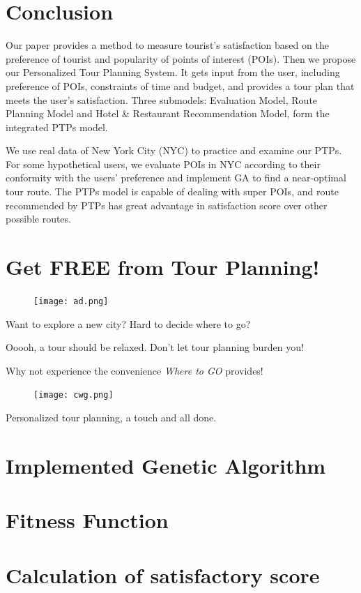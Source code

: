 \documentclass{mcmthesis}
\begin{document}
\section{Conclusion}
  Our paper provides a method to measure tourist's satisfaction based on the preference of tourist and popularity of points of interest (POIs). Then we propose our Personalized Tour Planning System. It gets input from the user, including preference of POIs, constraints of time and budget, and provides a tour plan that meets the user's satisfaction. Three submodels: Evaluation Model, Route Planning Model and Hotel \& Restaurant Recommendation Model, form the integrated PTPs model. \par
  We use real data of New York City (NYC) to practice and examine our PTPs. For some hypothetical users, we evaluate POIs in NYC according to their conformity with the users' preference and implement GA to find a near-optimal tour route. The PTPs model is capable of dealing with super POIs, and route recommended by PTPs has great advantage in satisfaction score over other possible routes.








\newpage
\section*{Get FREE from Tour Planning!}
  \begin{figure}[h]
    \centering
    \texttt{[image: ad.png]}
  \end{figure}
Want to explore a new city? Hard to decide where to go? \par
Ooooh, a tour should be relaxed. Don't let tour planning burden you! \par
  \centering
Why not experience the convenience \emph{Where to GO} provides!\par
  \begin{figure}[h]
    \centering
    \texttt{[image: cwg.png]}
  \end{figure}
\begin{large}
  Personalized tour planning, a touch and all done.
\end{large}

	

	
\newpage

\begin{appendices}
  \section{Implemented Genetic Algorithm}
  
  \section{Fitness Function}
  
  \section{Calculation of satisfactory score}
  
\end{appendices}
\end{document}
